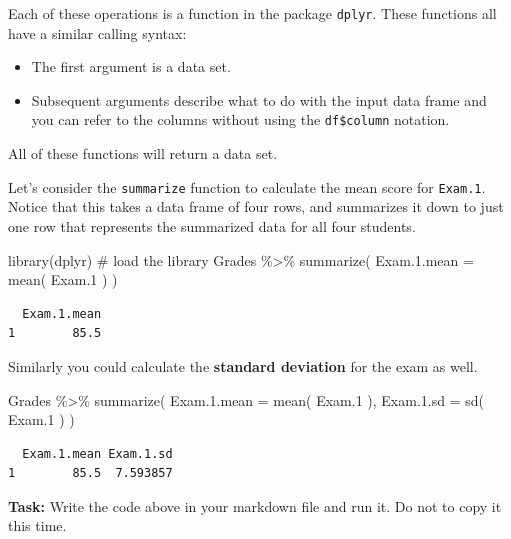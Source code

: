 \documentclass[
  letterpaper,
  DIV=11,
  numbers=noendperiod]{scrreprt}
\newenvironment{Shaded}{\begin{snugshade}}{\end{snugshade}}
\newcommand{\AttributeTok}[1]{\textcolor[rgb]{0.40,0.45,0.13}{#1}}
\newcommand{\CommentTok}[1]{\textcolor[rgb]{0.37,0.37,0.37}{#1}}
\newcommand{\FloatTok}[1]{\textcolor[rgb]{0.68,0.00,0.00}{#1}}
\newcommand{\FunctionTok}[1]{\textcolor[rgb]{0.28,0.35,0.67}{#1}}
\newcommand{\NormalTok}[1]{\textcolor[rgb]{0.00,0.23,0.31}{#1}}
\newcommand{\SpecialCharTok}[1]{\textcolor[rgb]{0.37,0.37,0.37}{#1}}
\begin{document}
Each of these operations is a function in the package \texttt{dplyr}.
These functions all have a similar calling syntax:

\begin{itemize}
\item
  The first argument is a data set.
\item
  Subsequent arguments describe what to do with the input data frame and
  you can refer to the columns without using the \texttt{df\$column}
  notation.
\end{itemize}

All of these functions will return a data set.

Let's consider the \texttt{summarize} function to calculate the mean
score for \texttt{Exam.1}. Notice that this takes a data frame of four
rows, and summarizes it down to just one row that represents the
summarized data for all four students.

\begin{Shaded}
\begin{Highlighting}[]
\FunctionTok{library}\NormalTok{(dplyr) }\CommentTok{\# load the library}
\NormalTok{Grades }\SpecialCharTok{\%\textgreater{}\%}
  \FunctionTok{summarize}\NormalTok{( }\AttributeTok{Exam.1.mean =} \FunctionTok{mean}\NormalTok{( Exam}\FloatTok{.1}\NormalTok{ ) )}
\end{Highlighting}
\end{Shaded}

\begin{verbatim}
  Exam.1.mean
1        85.5
\end{verbatim}

Similarly you could calculate the \textbf{standard deviation} for the
exam as well.

\begin{Shaded}
\begin{Highlighting}[]
\NormalTok{Grades }\SpecialCharTok{\%\textgreater{}\%}
  \FunctionTok{summarize}\NormalTok{( }\AttributeTok{Exam.1.mean =} \FunctionTok{mean}\NormalTok{( Exam}\FloatTok{.1}\NormalTok{ ),}
             \AttributeTok{Exam.1.sd   =} \FunctionTok{sd}\NormalTok{(   Exam}\FloatTok{.1}\NormalTok{   ) )}
\end{Highlighting}
\end{Shaded}

\begin{verbatim}
  Exam.1.mean Exam.1.sd
1        85.5  7.593857
\end{verbatim}

\textbf{Task:} Write the code above in your markdown file and run it. Do
not to copy it this time.
\end{document}
